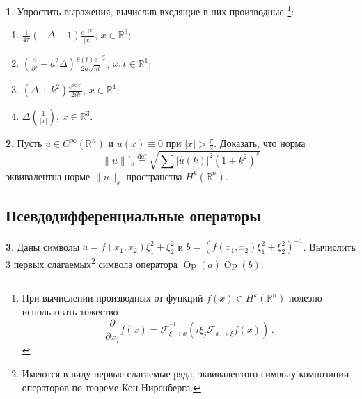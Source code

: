 \documentclass[a4paper, 12pt]{article}
\theoremstyle{definition}
\newtheorem{exercise}{}
\begin{document}
\begin{exercise} %
    Упростить выражения, вычислив входящие в них производные 
    \footnote{При вычислении производных от функций \({ f(x) \in H^{k}(\mathbb R^{n}) }\) полезно использовать тожество \[
        \frac{\partial}{\partial x_j} f(x) = \mathcal F^{^{-1}}_{\xi \to x} (i\xi_{j} \mathcal F_{x \to \xi}f(x))\,.
    \]}:
    \begin{enumerate}
        \item \({ \displaystyle \frac{1}{4\pi} (- \Delta + 1) \frac{e^{-\lvert x \rvert}}{\lvert x \rvert} }\), \({ x \in \mathbb R^3 }\); \\
        \item \({ \displaystyle \left( \frac{\partial}{\partial t} - a^2 \Delta \right) \frac{\theta(t) e^{-\frac{x^2}{4t}}}{2a \sqrt{\pi t}} }\), \({ x, t \in \mathbb R^{1} }\); \\
        \item \({ \displaystyle (\Delta + k^2) \frac{e^{ik \lvert x \rvert}}{2ik} }\), \({ x \in \mathbb R^{1} }\);
        \item \({ \displaystyle \Delta\left( \frac{1}{\lvert x \rvert} \right) }\), \({ x \in \mathbb R^3 }\).
    \end{enumerate}
\end{exercise}

\begin{exercise}
    Пусть \({ u \in C^{\infty}(\mathbb R^{n}) }\) и \({ u(x) \equiv 0 }\) при \({ \lvert x \rvert > \frac{\pi}{2} }\). 
    Доказать, что норма \[
        \lVert u \rVert'_{s} \overset{\text{def}}= \sqrt{\sum \lvert \hat{u}(k) \rvert^2 (1 + k^2)^{s}}
    \] эквивалентна норме \({ \lVert u \rVert_{s} }\) пространства \({ H^{k}(\mathbb R^{n}) }\).
\end{exercise}

\subsection{Псевдодифференциальные операторы} %

\begin{exercise}
    Даны символы \({ a = f(x_1, x_2) \xi_1^2 + \xi_2^2 }\) и \({ b = \left( f(x_1, x_2) \xi_1^2 + \xi_2^2 \right)^{-1} }\). Вычислить \({ 3 }\) первых слагаемых\footnote{Имеются в виду первые слагаемые ряда, эквивалентого символу композиции операторов по теореме Кон-Ниренберга.} символа оператора \({ \operatorname{Op}(a) \operatorname{Op}(b) }\).
\end{exercise}
\end{document}
